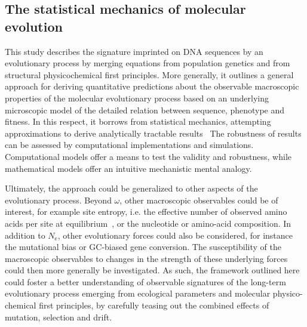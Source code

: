 \documentclass[authoryear]{elsarticle} %
\newcommand{\Ne}{N_{\text{e}}} %
\begin{document}
\subsection{The statistical mechanics of molecular evolution}

This study describes the signature imprinted on DNA sequences by an evolutionary process by merging equations from population genetics and from structural physicochemical first principles.
More generally, it outlines a general approach for deriving quantitative predictions about the observable macroscopic properties of the molecular evolutionary process based on an underlying microscopic model of the detailed relation between sequence, phenotype and fitness.
In this respect, it borrows from statistical mechanics, attempting approximations to derive analytically tractable results~\citep{Sella2005, Mustonen2009, Bastolla2012, Bastolla2017}
The robustness of results can be assessed by computational implementations and simulations.
Computational models offer a means to test the validity and robustness, while mathematical models offer an intuitive mechanistic mental analogy.

Ultimately, the approach could be generalized to other aspects of the evolutionary process.
Beyond $\omega$, other macroscopic observables could be of interest, for example site entropy, i.e. the effective number of observed amino acids per site at equilibrium~\citep{Goldstein2016, Jimenez2018, Jiang2018}, or the nucleotide or amino-acid composition.
In addition to $\Ne$, other evolutionary forces could also be considered, for instance the mutational bias or GC-biased gene conversion.
The susceptibility of the macroscopic observables to changes in the strength of these underlying forces could then more generally be investigated.
As such, the framework outlined here could foster a better understanding of observable signatures of the long-term evolutionary process emerging from ecological parameters and molecular physico-chemical first principles, by carefully teasing out the combined effects of mutation, selection and drift.
\end{document}
